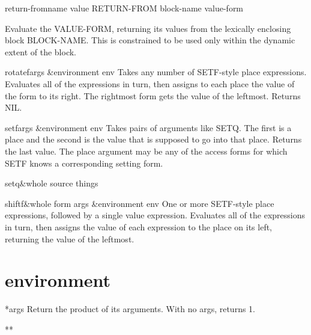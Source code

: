 \begin{specialop}{return-from}{name \op value}{}
  RETURN-FROM block-name value-form

Evaluate the VALUE-FORM, returning its values from the lexically enclosing
block BLOCK-NAME. This is constrained to be used only within the dynamic
extent of the block.
\end{specialop}

\begin{macro}{rotatef}{\rest args &environment env}{}
  Takes any number of SETF-style place expressions. Evaluates all of the
   expressions in turn, then assigns to each place the value of the form to
   its right. The rightmost form gets the value of the leftmost.
   Returns NIL.
\end{macro}

\begin{macro}{setf}{\rest args &environment env}{}
  Takes pairs of arguments like SETQ. The first is a place and the second
  is the value that is supposed to go into that place. Returns the last
  value. The place argument may be any of the access forms for which SETF
  knows a corresponding setting form.
\end{macro}

\begin{special-form}{setq}{&whole source \rest things}{}
  
\end{special-form}

\begin{macro}{shiftf}{&whole form \rest args &environment env}{}
  One or more SETF-style place expressions, followed by a single
   value expression. Evaluates all of the expressions in turn, then
   assigns the value of each expression to the place on its left,
   returning the value of the leftmost.
\end{macro}

\section{environment}

\begin{variable}{*}{\rest args}{}
  Return the product of its arguments. With no args, returns 1.
\end{variable}

\begin{variable}{**}{}{}
  
\end{variable}

